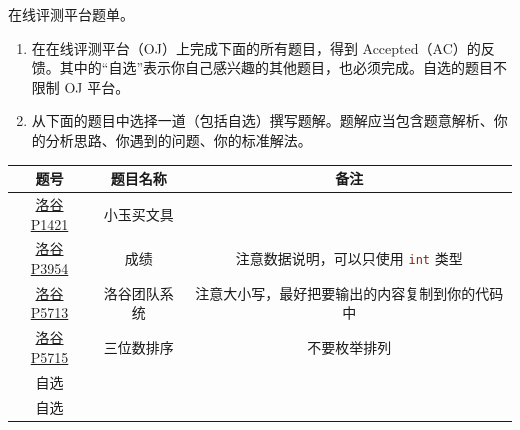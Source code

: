 \begin{problemset}
	\item 在线评测平台题单。

	\begin{enumerate}
		\item 在在线评测平台（OJ）上完成下面的所有题目，得到 Accepted（AC）的反馈。其中的“自选”表示你自己感兴趣的其他题目，也必须完成。自选的题目不限制 OJ 平台。
		\item 从下面的题目中选择一道（包括自选）撰写题解。题解应当包含题意解析、你的分析思路、你遇到的问题、你的标准解法。
	\end{enumerate}

	\begin{table}[H]
		\centering
		\begin{tabular}{|c|c|c|}\hline
			题号 & 题目名称 & 备注
			\\\hline
			\href{https://www.luogu.com.cn/problem/P1421}{洛谷 P1421} & 小玉买文具 &
			\\\hline
			\href{https://www.luogu.com.cn/problem/P3954}{洛谷 P3954} & 成绩 & 注意数据说明，可以只使用 \lstinline[language=c]$int$ 类型
			\\\hline
			\href{https://www.luogu.com.cn/problem/P5713}{洛谷 P5713} & 洛谷团队系统 & 注意大小写，最好把要输出的内容复制到你的代码中
			\\\hline
			\href{https://www.luogu.com.cn/problem/P5715}{洛谷 P5715} & 三位数排序 & 不要枚举排列
			\\\hline
			自选 & &
			\\\hline
			自选 & &
			\\\hline
		\end{tabular}
	\end{table}

\end{problemset}